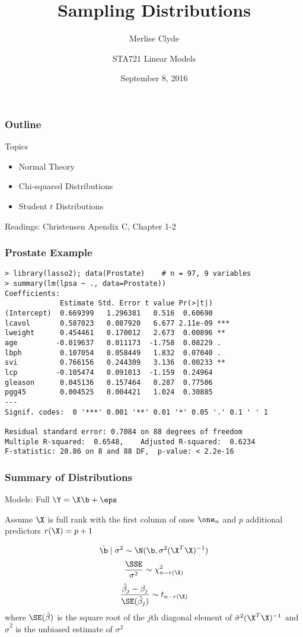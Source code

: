 \documentclass{beamer}
\title{Sampling Distributions}
\subtitle{Merlise Clyde}
\author{STA721 Linear Models}
\institute{Duke University}
\date{September 8, 2016}
\begin{document}
\maketitle

\begin{frame}\frametitle{Outline}
Topics 
  \begin{itemize}
  \item Normal Theory
  \item Chi-squared Distributions
  \item Student $t$ Distributions
  \end{itemize}

\vspace{24pt}
Readings:  Christensen Apendix C, Chapter 1-2 
\end{frame}

\begin{frame}[fragile]
  \frametitle{Prostate Example}
  \begin{small}
\begin{verbatim}
> library(lasso2); data(Prostate)    # n = 97, 9 variables
> summary(lm(lpsa ~ ., data=Prostate))
Coefficients:
             Estimate Std. Error t value Pr(>|t|)    
(Intercept)  0.669399   1.296381   0.516  0.60690    
lcavol       0.587023   0.087920   6.677 2.11e-09 ***
lweight      0.454461   0.170012   2.673  0.00896 ** 
age         -0.019637   0.011173  -1.758  0.08229 .  
lbph         0.107054   0.058449   1.832  0.07040 .  
svi          0.766156   0.244309   3.136  0.00233 ** 
lcp         -0.105474   0.091013  -1.159  0.24964    
gleason      0.045136   0.157464   0.287  0.77506    
pgg45        0.004525   0.004421   1.024  0.30885    
---
Signif. codes:  0 '***' 0.001 '**' 0.01 '*' 0.05 '.' 0.1 ' ' 1

Residual standard error: 0.7084 on 88 degrees of freedom
Multiple R-squared:  0.6548,	Adjusted R-squared:  0.6234 
F-statistic: 20.86 on 8 and 88 DF,  p-value: < 2.2e-16
\end{verbatim}
    
\end{small}

\end{frame}

\begin{frame}
  \frametitle{Summary of Distributions}

Models:  Full  $\Y = \X\b + \eps$ 

Assume $\X$ is full rank with the first column of ones $\one_n$ and $p$ additional predictors $r(\X) = p +1$

   $$\hat{\b} \mid \sigma^2 \sim \N(\b, \sigma^2 (\X^T\X)^{-1})$$
   $$\frac{\SSE }{\sigma^2} \sim \chi^2_{n - r(\X)}$$
   $$\frac{\hat{\beta}_j - \beta_j}{\SE(\hat{\beta}_j)} \sim t_{n - r(\X)}$$
where  $\SE(\hat{\beta})$  is the square root of the  $j$th diagonal element of $\hat{\sigma}^2 (\X^T\X)^{-1}$   and $\hat{\sigma}^2$ is the unbiased estimate of $\sigma^2$
\end{frame}
\end{document}
